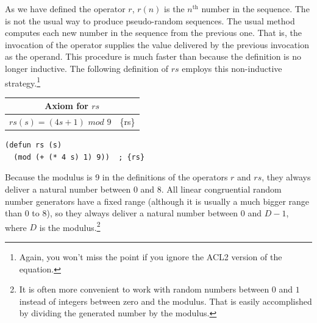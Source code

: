 As we have defined the operator $r$, $r(n)$ is the
$n^\text{th}$ number in the sequence.
The is not the usual way to produce pseudo-random sequences.
The usual method computes each new number in the sequence from the previous one.
That is, the invocation of the operator
supplies the value delivered by the previous invocation as
the operand. This procedure is much faster than
because the definition is no longer inductive.
The following definition of $rs$
employs this non-inductive strategy.\footnote{Again, you won't miss the point
if you ignore the ACL2 version of the equation.}

\begin{center}
\begin{tabular}{ll}
\multicolumn{2}{c}{Axiom for $rs$}\\
\hline
$rs(s) = (4s + 1)$ $mod$ $9$ & \{rs\}\\
\end{tabular}
\end{center}
\begin{code}
\begin{verbatim}
(defun rs (s)
  (mod (+ (* 4 s) 1) 9))  ; {rs}
\end{verbatim}
\end{code}

Because the modulus is 9 in the definitions of the operators
$r$ and $rs$, they always deliver a natural number between 0 and 8.
All linear congruential random number generators
have a fixed range (although it is usually a much bigger range than 0 to 8),
so they always deliver
a natural number between 0 and $D-1$, where $D$ is the modulus.\footnote{It
is often more convenient to work with random numbers between $0$ and $1$
instead of integers between zero and the modulus.
That is easily accomplished by dividing the generated number
by the modulus.}

